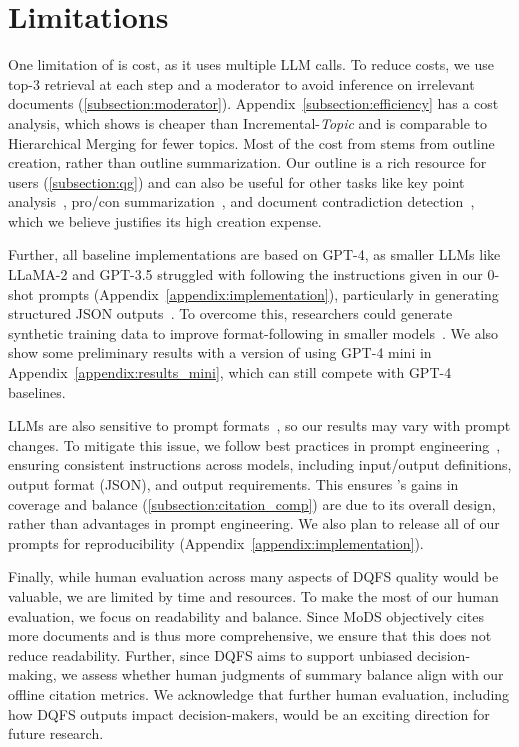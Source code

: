 \section{Limitations}

One limitation of \model is cost, as it uses multiple LLM calls. To reduce costs, we use top-3 retrieval at each step and a moderator to avoid inference on irrelevant documents (\cref{subsection:moderator}).
Appendix~\ref{subsection:efficiency} has a cost analysis, which shows \model is cheaper than Incremental-\emph{Topic} and is comparable to Hierarchical Merging for fewer topics.
Most of the cost from \model stems from outline creation, rather than outline summarization.
Our outline is a rich resource for users (\cref{subsection:qg}) and can also be useful for other tasks like key point analysis~\cite{bar2020arguments, kumar2023apcs}, pro/con summarization~\cite{hu2009classification}, and document contradiction detection~\cite{deusser2023contradiction}, which we believe justifies its high creation expense.

Further, all baseline implementations are based on GPT-4, as smaller LLMs like LLaMA-2 and GPT-3.5 struggled with following the instructions given in our 0-shot prompts (Appendix~\ref{appendix:implementation}), particularly in generating structured JSON outputs~\cite{xia2024fofo}. To overcome this, researchers could generate synthetic training data to improve format-following in smaller models~\cite{long2024llms}.
We also show some preliminary results with a version of \model using GPT-4 mini in Appendix~\ref{appendix:results_mini}, which can still compete with GPT-4 baselines. 

LLMs are also sensitive to prompt formats~\cite{sclar2023quantifying}, so our results may vary with prompt changes.
To mitigate this issue, we follow best practices in prompt engineering~\cite{schulhoff2024prompt}, ensuring consistent instructions across models, including input/output definitions, output format (JSON), and output requirements.
This ensures \model's gains in coverage and balance (\cref{subsection:citation_comp}) are due to its overall design, rather than advantages in prompt engineering.
We also plan to release all of our prompts for reproducibility (Appendix~\ref{appendix:implementation}).

Finally, while human evaluation across many aspects of DQFS quality would be valuable, we are limited by time and resources. To make the most of our human evaluation, we focus on readability and balance. Since MoDS objectively cites more documents and is thus more comprehensive, we ensure that this does not reduce readability. Further, since DQFS aims to support unbiased decision-making, we assess whether human judgments of summary balance align with our offline citation metrics. We acknowledge that further human evaluation, including how DQFS outputs impact decision-makers, would be an exciting direction for future research.

